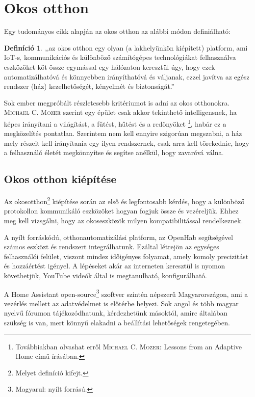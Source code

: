 \documentclass{thesis-ekf}
\theoremstyle{definition}
\newtheorem{definicio}[tetel]{Definíció}
\begin{document}
 

\section{Okos otthon}
Egy tudományos cikk alapján az okos otthon az alábbi módon definiálható:
\begin{definicio}\label{smarthomeDef}
,,az okos otthon egy olyan (a lakhelyünkön kiépített) platform, ami IoT-s, kommunikációs  és különböző számítógépes technológiákat felhasználva eszközöket köt össze egymással egy hálózaton keresztül úgy, hogy ezek automatizálhatóvá és könnyebben irányíthatóvá és váljanak, ezzel javítva az egész rendszer (ház) kezelhetőségét, kényelmét és biztonságát.''\cite{smarthome}
\end{definicio}
Sok ember megpróbált részletesebb kritériumot is adni az okos otthonokra. \textsc{Michael C. Mozer} szerint egy épület csak akkor tekinthető intelligensnek, ha képes irányítani a világítást,
a fűtést, hűtést és a redőnyöket \footnote{Továbbiakban olvashat erről \textsc{Michael C. Mozer}: Lessons from an Adaptive Home című írásában.\cite{Mozer}}, habár ez a megközelítés pontatlan. Szerintem nem kell ennyire szigorúan megszabni, a ház mely részeit kell irányítania egy ilyen rendszernek, csak arra kell törekednie, hogy a felhasználó életét megkönnyítse és
segítse anélkül, hogy zavaróvá válna.

\subsection{Okos otthon kiépítése}
Az okosotthon\footnote{Melyet  definíció kifejt.} kiépítése során az első és legfontosabb kérdés, hogy a különböző protokollon kommunikáló eszközöket hogyan fogjuk össze és vezéreljük. Ehhez meg kell vizsgálni, hogy az okoseszközök milyen kompatibilitással rendelkeznek.

A nyílt forráskódú, otthonautomatizálási platform, az OpenHab segítségével számos eszközt és rendszert integrálhatunk. Ezáltal létrejön az egységes felhasználói felület, viszont mindez időigényes folyamat, amely komoly precizitást és hozzáértést igényel. A lépéseket akár az interneten keresztül is nyomon követhetjük, YouTube videók által is megtanulható, konfigurálható.

A Home Assistant open-source\footnote{Magyarul: nyílt forrású.} szoftver szintén népszerű Magyarországon, ami a vezérlés mellett az adatvédelmet is előtérbe helyezi. Sok angol és több magyar nyelvű fórumon tájékozódhatunk, kérdezhetünk másoktól, amire általában szükség is van, mert könnyű elakadni a beállítási lehetőségek rengetegében.
\end{document}
